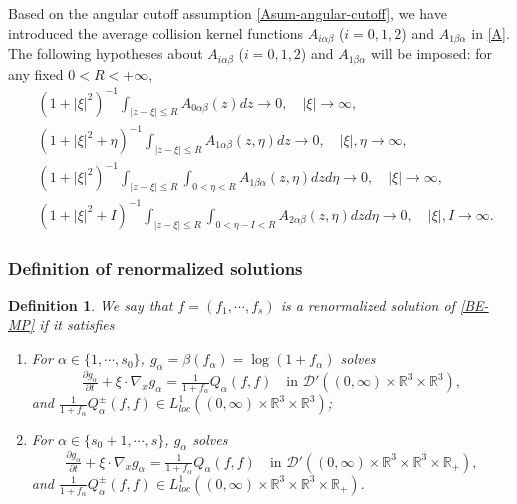 \documentclass[reqno,11pt]{amsart}
\newtheorem{definition}{Definition}[section]
\numberwithin{equation}{section}
\def\R{\mathbb{R}}
\begin{document}
Based on the angular cutoff assumption \eqref{Asum-angular-cutoff}, we have introduced the average collision kernel functions $A_{i \alpha \beta}$ ($i=0,1,2$) and $A_{1 \beta \alpha }$ in \eqref{A}. The following hypotheses about $A_{i \alpha \beta}$ ($i=0,1,2$) and $A_{1 \beta \alpha }$ will be imposed: for any fixed $0 < R < + \infty$,
\begin{equation}\label{collision}
    \begin{aligned}
        & ( 1 + | \xi |^2 )^{-1} \int_{ | z - \xi | \leq R } A_{ 0 \alpha \beta } (z) d z \rightarrow 0, \quad | \xi | \rightarrow \infty, \\
        & ( 1 + | \xi |^2 +  \eta )^{-1} \int_{ | z -\xi | \leq R } A_{ 1 \alpha \beta } ( z, \eta ) d z \rightarrow 0,  \quad | \xi |,\eta  \rightarrow \infty, \\
        & ( 1 + | \xi |^2 )^{-1} \int_{ | z - \xi | \leq R } \int_{ 0 < \eta < R } A_{ 1 \beta \alpha } ( z, \eta ) d z d \eta \rightarrow 0, \quad | \xi | \rightarrow \infty , \\
        & ( 1 + | \xi |^2 +  I )^{-1} \int_{ | z - \xi | \leq R } \int_{ 0 < \eta - I < R } A_{ 2 \alpha \beta } ( z , \eta ) d z d \eta \rightarrow 0, \quad | \xi |, I \rightarrow \infty .
    \end{aligned}
\end{equation}



\subsubsection{Definition of renormalized solutions}

\begin{definition}\label{Def-RNS}
	We say that $f=(f_1,\cdots,f_s)$ is a renormalized solution of \eqref{BE-MP} if it satisfies 
	\begin{enumerate}
		\item {For $\alpha \in \{1,\cdots,s_0\}$, $g_\alpha = \beta (f_\alpha) = \log (1+f_\alpha)$ solves
			\begin{equation*}
				\tfrac{\partial g_\alpha}{\partial t } + \xi \cdot \nabla_{x} g_\alpha =\tfrac{1}{1+f_\alpha} Q_\alpha (f,f) \quad \text{in } \mathscr{D}'((0,\infty)\times \R^3 \times \R^3),
		\end{equation*} 
and $\frac{1}{1 + f_\alpha} Q_\alpha^\pm (f,f) \in L_{loc}^1 ( (0, \infty) \times \R^3 \times \R^3 )$;}
		\item {For $\alpha \in \{s_0+1,\cdots ,s\}$, $g_\alpha$ solves
			\begin{equation*}
				\tfrac{\partial g_\alpha}{\partial t } + \xi \cdot \nabla_{x} g_\alpha =\tfrac{1}{1+f_\alpha} Q_\alpha (f,f) \quad \text{in } \mathscr{D}'((0,\infty)\times \R^3 \times \R^3\times \R_+),
		\end{equation*}
and $\frac{1}{1 + f_\alpha} Q_\alpha^\pm (f,f) \in L_{loc}^1 ( (0, \infty) \times \R^3 \times \R^3 \times \R_+ )$.}
	\end{enumerate}
\end{definition}
\end{document}
